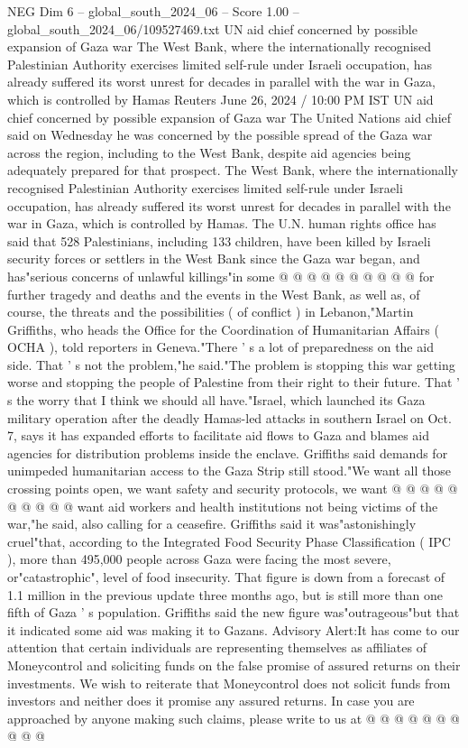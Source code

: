 \begin{textsample}{NEG Dim 6 – global\_south\_2024\_06 – Score 1.00 – global\_south\_2024\_06/109527469.txt}  \label{ex:f6_neg_273}
UN aid chief concerned by possible expansion of Gaza war The West Bank, where the internationally recognised Palestinian Authority exercises limited self-rule under Israeli occupation, has already suffered its worst unrest for decades in parallel with the war in Gaza, which is controlled by Hamas Reuters June 26, 2024 / 10:00 PM IST UN aid chief concerned by possible expansion of Gaza war The United Nations aid chief said on Wednesday he was concerned by the possible spread of the Gaza war across the region, including to the West Bank, despite aid agencies being adequately prepared for that prospect.
The West Bank, where the internationally recognised Palestinian Authority exercises limited self-rule under Israeli occupation, has already suffered its worst unrest for decades in parallel with the war in Gaza, which is controlled by Hamas.
The U.N. human rights office has said that 528 Palestinians, including 133 children, have been killed by Israeli security forces or settlers in the West Bank since the Gaza war began, and has"serious concerns of unlawful killings"in some @ @ @ @ @ @ @ @ @ @ for further tragedy and deaths and the events in the West Bank, as well as, of course, the threats and the possibilities ( of conflict ) in Lebanon,"Martin Griffiths, who heads the Office for the Coordination of Humanitarian Affairs ( OCHA ), told reporters in Geneva."There ' s a lot of preparedness on the aid side.
That ' s not the problem,"he said."The problem is stopping this war getting worse and stopping the people of Palestine from their right to their future.
That ' s the worry that I think we should all have."Israel, which launched its Gaza military operation after the deadly Hamas-led attacks in southern Israel on Oct. 7, says it has expanded efforts to facilitate aid flows to Gaza and blames aid agencies for distribution problems inside the enclave.
Griffiths said demands for unimpeded humanitarian access to the Gaza Strip still stood."We want all those crossing points open, we want safety and security protocols, we want @ @ @ @ @ @ @ @ @ @ want aid workers and health institutions not being victims of the war,"he said, also calling for a ceasefire.
Griffiths said it was"astonishingly cruel"that, according to the Integrated Food Security Phase Classification ( IPC ), more than 495,000 people across Gaza were facing the most severe, or"catastrophic", level of food insecurity.
That figure is down from a forecast of 1.1 million in the previous update three months ago, but is still more than one fifth of Gaza ' s population.
Griffiths said the new figure was"outrageous"but that it indicated some aid was making it to Gazans.
Advisory Alert:It has come to our attention that certain individuals are representing themselves as affiliates of Moneycontrol and soliciting funds on the false promise of assured returns on their investments.
We wish to reiterate that Moneycontrol does not solicit funds from investors and neither does it promise any assured returns.
In case you are approached by anyone making such claims, please write to us at @ @ @ @ @ @ @ @ @ @

\end{textsample}
